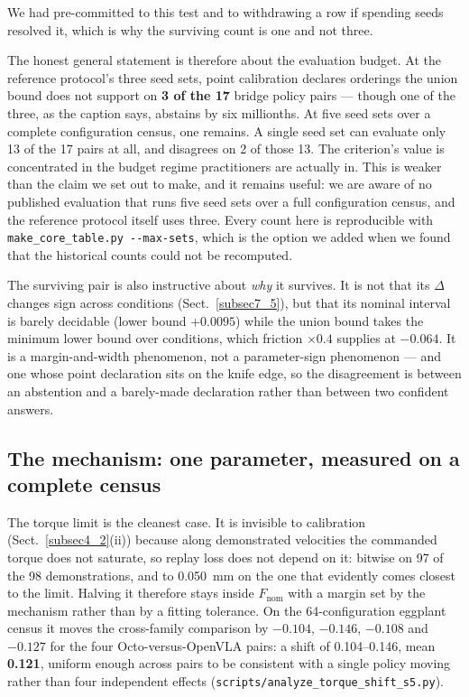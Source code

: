\documentclass[pdflatex,iicol,sn-apa]{sn-jnl}
\theoremstyle{remark}
\begin{document}
We had pre-committed to this test and to withdrawing a row if spending seeds resolved it, which is
why the surviving count is one and not three.

The honest general statement is therefore about the evaluation budget. At the reference protocol's
three seed sets, point calibration declares orderings the union bound does not support on
\textbf{3 of the 17} bridge policy pairs --- though one of the three, as the caption says, abstains
by six millionths. At five seed sets over a complete configuration census, one remains. A single
seed set can evaluate only 13 of the 17 pairs at all, and disagrees on 2 of those 13. The
criterion's value is concentrated in the budget
regime practitioners are actually in. This is weaker than the claim we set out to make, and it
remains useful: we are aware of no published evaluation that runs five seed sets over a full
configuration census, and the reference protocol itself uses three. Every count here is reproducible
with \texttt{make\_core\_table.py -}\texttt{-max-sets}, which is the option we added when we found
that the historical counts could not be recomputed.

The surviving pair is also instructive about \emph{why} it survives. It is not that its $\Delta$
changes sign across conditions (Sect.~\ref{subsec7_5}), but that its nominal interval is barely
decidable (lower bound $+0.0095$) while the union bound takes the minimum lower bound over
conditions, which friction $\times 0.4$ supplies at $-0.064$. It is a margin-and-width phenomenon,
not a parameter-sign phenomenon --- and one whose point declaration sits on the knife edge, so the
disagreement is between an abstention and a barely-made declaration rather than between two
confident answers.

\subsection{The mechanism: one parameter, measured on a complete census}\label{subsec7_3}

The torque limit is the cleanest case. It is invisible to calibration
(Sect.~\ref{subsec4_2}(ii)) because along demonstrated velocities the commanded torque does not
saturate, so replay loss does not depend on it: bitwise on 97 of the 98 demonstrations, and to
0.050~mm on the one that evidently comes closest to the limit. Halving it therefore stays inside
$F_{\mathrm{nom}}$ with a margin set by the mechanism rather than by a fitting tolerance. On the 64-configuration eggplant census it
moves the cross-family comparison by $-0.104$, $-0.146$, $-0.108$ and $-0.127$ for the four
Octo-versus-OpenVLA pairs: a shift of 0.104--0.146, mean \textbf{0.121}, uniform enough across pairs
to be consistent with a single policy moving rather than four independent effects
(\texttt{scripts/analyze\_torque\_shift\_s5.py}).
\end{document}
